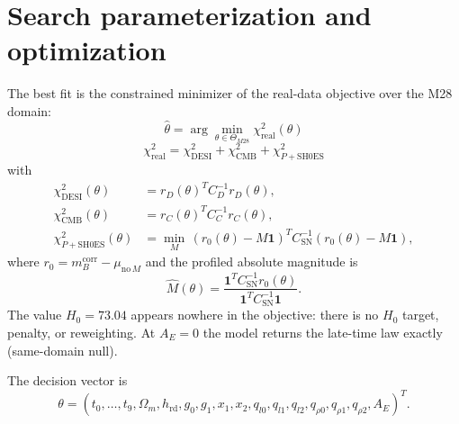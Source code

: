 \section{Search parameterization and optimization}
\label{app:search}

The best fit is the constrained minimizer of the real-data objective
over the M28 domain:
\begin{equation}
\boxed{\hat{\theta}
  = \arg\min_{\theta \in \Theta_{M28}} \chi^{2}_{\mathrm{real}}(\theta)}
\end{equation}
\begin{equation}
\boxed{\chi^{2}_{\mathrm{real}}
  = \chi^{2}_{\mathrm{DESI}} + \chi^{2}_{\mathrm{CMB}}
  + \chi^{2}_{P+\mathrm{SH0ES}}}
\end{equation}
with
\begin{align}
\chi^{2}_{\mathrm{DESI}}(\theta)
  &= r_{D}(\theta)^{T} C_{D}^{-1} r_{D}(\theta), \\
\chi^{2}_{\mathrm{CMB}}(\theta)
  &= r_{C}(\theta)^{T} C_{C}^{-1} r_{C}(\theta), \\
\chi^{2}_{P+\mathrm{SH0ES}}(\theta)
  &= \min_{M}\,
     (r_{0}(\theta) - M\mathbf{1})^{T} C_{\mathrm{SN}}^{-1}
     (r_{0}(\theta) - M\mathbf{1}),
\end{align}
where $r_{0} = m_{B}^{\mathrm{corr}} - \mu_{\mathrm{no}\,M}$ and the
profiled absolute magnitude is
\begin{equation}
\hat{M}(\theta)
  = \frac{\mathbf{1}^{T} C_{\mathrm{SN}}^{-1} r_{0}(\theta)}
         {\mathbf{1}^{T} C_{\mathrm{SN}}^{-1} \mathbf{1}}.
\end{equation}
The value $H_{0} = 73.04$ appears nowhere in the objective: there is no
$H_{0}$ target, penalty, or reweighting. At $A_{E} = 0$ the model
returns the late-time law exactly (same-domain null).

The decision vector is
\begin{equation}
\theta = (t_{0},\dots,t_{9},\Omega_{m},h_{\mathrm{rd}},
g_{0},g_{1},x_{1},x_{2},
q_{l0},q_{l1},q_{l2},q_{\rho0},q_{\rho1},q_{\rho2},A_{E})^{T}.
\end{equation}

